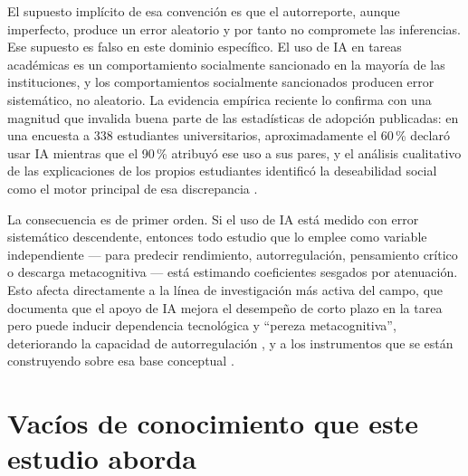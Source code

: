 \documentclass[11pt,a4paper]{article}
\begin{document}
El supuesto implícito de esa convención es que el autorreporte, aunque imperfecto, produce un error aleatorio y por tanto no compromete las inferencias. Ese supuesto es falso en este dominio específico. El uso de IA en tareas académicas es un comportamiento socialmente sancionado en la mayoría de las instituciones, y los comportamientos socialmente sancionados producen error sistemático, no aleatorio. La evidencia empírica reciente lo confirma con una magnitud que invalida buena parte de las estadísticas de adopción publicadas: en una encuesta a 338 estudiantes universitarios, aproximadamente el 60\,\% declaró usar IA mientras que el 90\,\% atribuyó ese uso a sus pares, y el análisis cualitativo de las explicaciones de los propios estudiantes identificó la deseabilidad social como el motor principal de esa discrepancia \citep{ling2026underreporting}.

La consecuencia es de primer orden. Si el uso de IA está medido con error sistemático descendente, entonces todo estudio que lo emplee como variable independiente --- para predecir rendimiento, autorregulación, pensamiento crítico o descarga metacognitiva --- está estimando coeficientes sesgados por atenuación. Esto afecta directamente a la línea de investigación más activa del campo, que documenta que el apoyo de IA mejora el desempeño de corto plazo en la tarea pero puede inducir dependencia tecnológica y ``pereza metacognitiva'', deteriorando la capacidad de autorregulación \citep{fan2025metacognitive}, y a los instrumentos que se están construyendo sobre esa base conceptual \citep{dizon2026assessing}.

\section{Vacíos de conocimiento que este estudio aborda}
\end{document}
